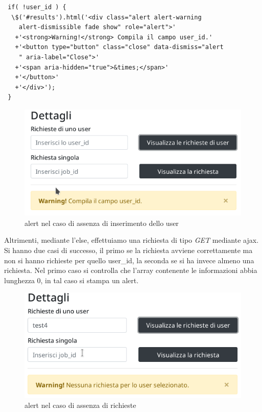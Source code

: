 \documentclass[a4paper,12pt, oneside]{book}
\begin{document}
\begin{shaded}
\begin{verbatim}
 if( !user_id ) {
  \$('#results').html('<div class="alert alert-warning
    alert-dismissible fade show" role="alert">'
   +'<strong>Warning!</strong> Compila il campo user_id.'
   +'<button type="button" class="close" data-dismiss="alert
    " aria-label="Close">'
   +'<span aria-hidden="true">&times;</span>'
   +'</button>'
   +'</div>');
 }
\end{verbatim}
\end{shaded}
\begin{figure}[H]
  \centering
  \includegraphics[scale = 0.7]{img/bad-user.png}
  \caption{alert nel caso di assenza di inserimento dello user}
\end{figure}
Altrimenti, mediante l'else, effettuiamo una richiesta di tipo \textit{GET} mediante ajax.
Si hanno due casi di successo, il primo se la richiesta avviene correttamente ma non
si hanno richieste per quello user\_id, la seconda se si ha invece almeno una richiesta.
Nel primo caso si controlla che l'array contenente le informazioni abbia lunghezza 0,
in tal caso si stampa un alert.
\begin{figure}[H]
  \centering
  \includegraphics[scale = 0.7]{img/no-user.png}
  \caption{alert nel caso di assenza di richieste}
\end{figure}
\end{document}
